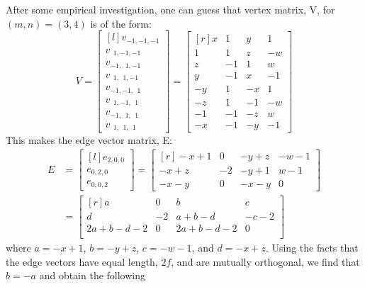 \documentclass[superscriptaddress,reprint,amsmath,amssymb,aps]{revtex4-1}
\begin{document}
After some empirical investigation, one can guess that vertex matrix, V, for
$(m,n) = (3,4)$ is of the form:
\begin{equation*}
V =
\begin{bmatrix*}[l]
v_{ -1, -1, -1} \\
v_{~~1, -1, -1} \\
v_{ -1,~~1, -1} \\
v_{~~1,~~1, -1} \\
v_{ -1, -1,~~1} \\
v_{~~1, -1,~~1} \\
v_{ -1,~~1,~~1} \\
v_{~~1,~~1,~~1}
\end{bmatrix*}
=
\begin{bmatrix*}[r]
   x &  1 &  y &  1 \\
   1 &  1 &  z & -w \\
   z & -1 &  1 &  w \\
   y & -1 &  x & -1 \\
  -y &  1 & -x &  1 \\
  -z &  1 & -1 & -w \\
  -1 & -1 & -z &  w \\
  -x & -1 & -y & -1
\end{bmatrix*}
\end{equation*}
This makes the edge vector matrix, E:
\begin{align*}
E &=
\begin{bmatrix*}[l]
e_{2,0,0} \\
e_{0,2,0} \\
e_{0,0,2}
\end{bmatrix*}
=  
\begin{bmatrix*}[r]
-x + 1 &  0 & -y + z & -w - 1 \\
-x + z & -2 & -y + 1 &  w - 1 \\
-x - y &  0 & -x - y &      0
\end{bmatrix*}
\\
&=  
\begin{bmatrix*}[r]
a        &  0 & b        &  c   \\
d        & -2 & a+b-d    & -c-2 \\
2a+b-d-2 &  0 & 2a+b-d-2 &  0   \\
\end{bmatrix*}
\end{align*}
where $a = -x+1$, $b = -y+z$, $c = -w-1$, and $d = -x+z$.
Using the facts that the edge vectors have equal length, $2 f$, and
are mutually orthogonal, we find that $b = -a$ and obtain the following
\end{document}
